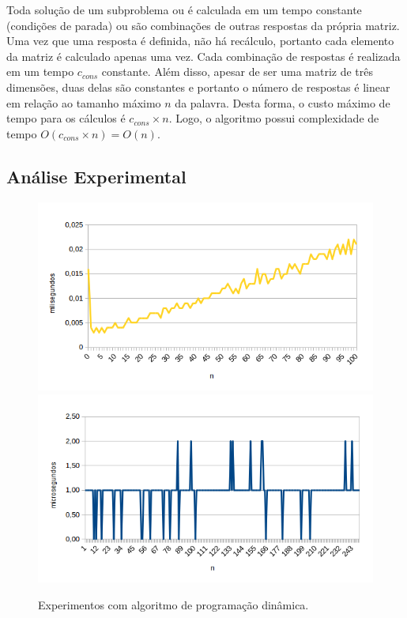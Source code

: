 \documentclass[a4paper,12pt,titlepage]{article}
\begin{document}
Toda solução de um subproblema ou é calculada em um tempo constante (condições de parada) ou são combinações de outras respostas da própria matriz. Uma vez que uma resposta é definida, não há recálculo, portanto cada elemento da matriz é calculado apenas uma vez. Cada combinação de respostas é realizada em um tempo $c_{cons}$ constante. Além disso, apesar de ser uma matriz de três dimensões, duas delas são constantes e portanto o número de respostas é linear em relação ao tamanho máximo $n$ da palavra. Desta forma, o custo máximo de tempo para os cálculos é $c_{cons} \times n$. Logo, o algoritmo possui complexidade de tempo $O(c_{cons} \times n) = O(n)$.

\subsection{Análise Experimental}

\begin{figure}[H]
     \centering
     \includegraphics[scale=0.48]{figures/chart-dp.png}
     \includegraphics[scale=0.48]{figures/chart-dp-all.png}
     \caption{Experimentos com algoritmo de programação dinâmica.}
\end{figure}
\end{document}
